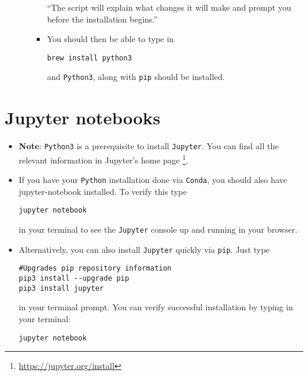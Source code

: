 \documentclass[11pt]{article}
\begin{document}
\begin{itemize}
\begin{itemize}
\begin{itemize}
``The script will explain what changes it will make and prompt you before the installation begins.''

\item You should then be able to type in
\begin{verbatim}
brew install python3
\end{verbatim}
and \texttt{Python3}, along with \texttt{pip} should be installed.
\end{itemize}
\end{itemize}
\end{itemize}

\section*{Jupyter notebooks}
\label{sec:org6dedccc}
\begin{itemize}
\item \textbf{Note}: \texttt{Python3} is a prerequisite to install \texttt{Jupyter}. You can find all the
relevant information in Jupyter's home page \footnote{\url{https://jupyter.org/install}}.
\item If you have your \texttt{Python} installation done via \texttt{Conda}, you should also have
jupyter-notebook installed. To verify this type
\begin{verbatim}
jupyter notebook
\end{verbatim}
in your terminal to see the \texttt{Jupyter} console up and running in your browser.
\item Alternatively, you can also install \texttt{Jupyter} quickly via \texttt{pip}. Just type
\begin{verbatim}
#Upgrades pip repository information
pip3 install --upgrade pip
pip3 install jupyter
\end{verbatim}
in your terminal prompt. You can verify successful installation by typing in
your terminal:
\begin{verbatim}
jupyter notebook
\end{verbatim}
\end{itemize}
\end{document}
